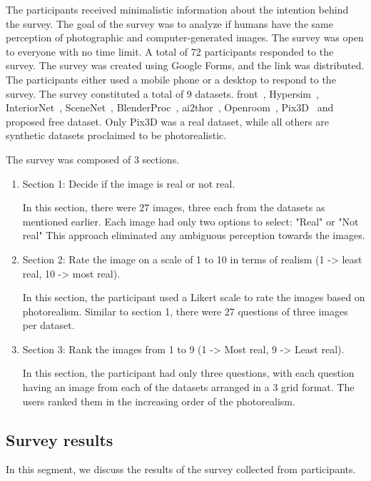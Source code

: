 The participants received minimalistic information about the intention behind the survey.
The goal of the survey was to analyze if humans have the same perception of photographic and computer-generated images.
The survey was open to everyone with no time limit.
A total of 72 participants responded to the survey.
The survey was created using Google Forms, and the link was distributed.
The participants either used a mobile phone or a desktop to respond to the survey.
The survey constituted a total of 9 datasets.
\gls{front}~\cite{Fu20203DFRONT3F}, Hypersim~\cite{Roberts2020HypersimAP}, InteriorNet~\cite{InteriorNet18}, SceneNet~\cite{McCormac:etal:ICCV2017}, BlenderProc~\cite{denninger2019blenderproc},
\gls{ai2thor}~\cite{kolve2019ai2thor}, Openroom~\cite{li2021openrooms}, Pix3D~\cite{pix3d} and proposed \gls{free} dataset.
Only Pix3D was a real dataset, while all others are synthetic datasets proclaimed to be photorealistic.

The survey was composed of 3 sections.
\begin{enumerate}
    \item Section 1: Decide if the image is real or not real.

    In this section, there were 27 images, three each from the datasets as mentioned earlier.
    Each image had only two options to select: "Real" or "Not real"
    This approach eliminated any ambiguous perception towards the images.

    \item Section 2: Rate the image on a scale of 1 to 10 in terms of realism (1 -> least real, 10 -> most real).

    In this section, the participant used a Likert scale to rate the images based on photorealism.
    Similar to section 1, there were 27 questions of three images per dataset.

    \item Section 3: Rank the images from 1 to 9 (1 -> Most real, 9 -> Least real).

    In this section, the participant had only three questions, with each question having an image from each of the datasets arranged in a 3 grid format.
    The users ranked them in the increasing order of the photorealism.
\end{enumerate}

\subsection{Survey results}\label{subsec:survey-results}
In this segment, we discuss the results of the survey collected from participants.

